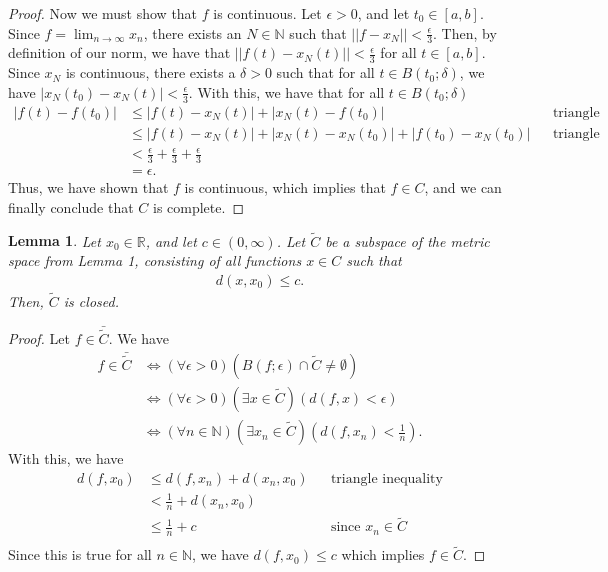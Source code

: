 \documentclass[10pt,a4paper]{article}
\theoremstyle{theorem}
\newtheorem{lemma}{Lemma}
\theoremstyle{definition}
\begin{document}
\begin{proof}
Now we must show that $f$ is continuous. Let $\epsilon >0$, and let $t_0 \in [a, b]$.  Since $f = \lim_{n \to \infty} x_n$, there exists an $N \in \mathbb{N}$ such that $||f - x_N|| < \frac{\epsilon}{3}$. Then, by definition of our norm, we have that $||f(t) - x_N(t)|| < \frac{\epsilon}{3}$ for all $t \in [a, b]$.  Since $x_N$ is continuous, there exists a $\delta >0$ such that for all $t \in B(t_0; \delta)$, we have $|x_N(t_0) - x_N(t)| < \frac{\epsilon}{3}$. With this, we have that for all $t \in B(t_0; \delta)$
\begin{align*}
|f(t) - f(t_0)| &\leq |f(t) - x_N(t)| + |x_N(t) - f(t_0)| && \text{triangle inequality}\\
&\leq |f(t) - x_N(t)| + |x_N(t) - x_N(t_0)| + |f(t_0) - x_N(t_0)| && \text{triangle inequality}\\
&< \frac{\epsilon}{3} + \frac{\epsilon}{3} + \frac{\epsilon}{3}\\
&= \epsilon.
\end{align*}
Thus, we have shown that $f$ is continuous, which implies that $f \in C$,  and we can finally conclude that $C$ is complete.
\end{proof}

\begin{lemma}
Let $x_0 \in \mathbb{R}$, and let $c \in (0, \infty)$. Let $\tilde{C}$ be a subspace of the metric space from Lemma 1, consisting of all functions $x \in C$ such that 
\begin{align*}
d(x, x_0) \leq c.
\end{align*}
Then, $\tilde{C}$ is closed.
\end{lemma}

\begin{proof}
Let $f \in \bar{\tilde{C}}$.  We have
\begin{align*}
f \in \bar{\tilde{C}} &\iff (\forall \epsilon > 0)(B(f; \epsilon) \cap \tilde{C} \not = \emptyset)\\
&\iff (\forall \epsilon > 0)(\exists x \in \tilde{C})(d(f, x) < \epsilon)\\
&\iff (\forall n \in \mathbb{N})(\exists x_n \in \tilde{C})(d(f, x_n) < \frac{1}{n}).
\end{align*}
With this, we have
\begin{align*}
d(f, x_0) &\leq d(f, x_n) + d(x_n, x_0) && \text{triangle inequality}\\
&< \frac{1}{n} + d(x_n, x_0)\\
&\leq \frac{1}{n} + c && \text{since } x_n \in \tilde{C}\\
\end{align*}
Since this is true for all $n \in \mathbb{N}$, we have $d(f, x_0) \leq c$ which implies $f \in \tilde{C}$.
\end{proof}
\end{document}
